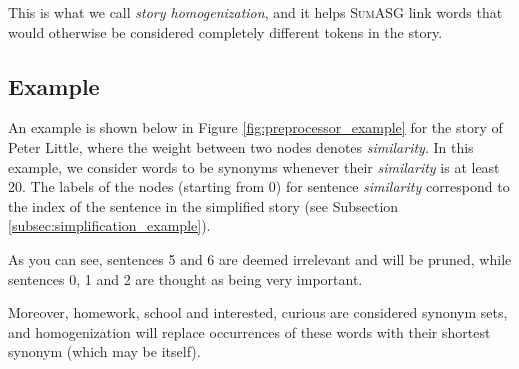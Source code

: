 This is what we call \textit{story homogenization}, and it helps \textsc{SumASG} link words that would otherwise be considered completely different tokens in the story.

\subsection{Example}

An example is shown below in Figure \ref{fig:preprocessor_example} for the story of Peter Little, where the weight between two nodes denotes \textit{similarity}. In this example, we consider words to be synonyms whenever their \textit{similarity} is at least 20. The labels of the nodes (starting from 0) for sentence \textit{similarity} correspond to the index of the sentence in the simplified story (see Subsection \ref{subsec:simplification_example}).

As you can see, sentences 5 and 6 are deemed irrelevant and will be pruned, while sentences 0, 1 and 2 are thought as being very important.

Moreover, {homework, school} and {interested, curious} are considered synonym sets, and homogenization will replace occurrences of these words with their shortest synonym (which may be itself).

